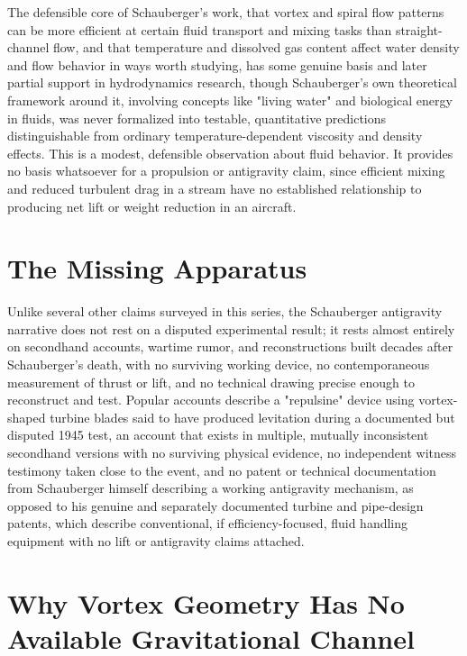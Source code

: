 \documentclass[11pt]{article}
\begin{document}
The defensible core of Schauberger's work, that vortex and spiral flow patterns can be more efficient at certain fluid transport and mixing tasks than straight-channel flow, and that temperature and dissolved gas content affect water density and flow behavior in ways worth studying, has some genuine basis and later partial support in hydrodynamics research, though Schauberger's own theoretical framework around it, involving concepts like "living water" and biological energy in fluids, was never formalized into testable, quantitative predictions distinguishable from ordinary temperature-dependent viscosity and density effects. This is a modest, defensible observation about fluid behavior. It provides no basis whatsoever for a propulsion or antigravity claim, since efficient mixing and reduced turbulent drag in a stream have no established relationship to producing net lift or weight reduction in an aircraft.

\section{The Missing Apparatus}

Unlike several other claims surveyed in this series, the Schauberger antigravity narrative does not rest on a disputed experimental result; it rests almost entirely on secondhand accounts, wartime rumor, and reconstructions built decades after Schauberger's death, with no surviving working device, no contemporaneous measurement of thrust or lift, and no technical drawing precise enough to reconstruct and test. Popular accounts describe a "repulsine" device using vortex-shaped turbine blades said to have produced levitation during a documented but disputed 1945 test, an account that exists in multiple, mutually inconsistent secondhand versions with no surviving physical evidence, no independent witness testimony taken close to the event, and no patent or technical documentation from Schauberger himself describing a working antigravity mechanism, as opposed to his genuine and separately documented turbine and pipe-design patents, which describe conventional, if efficiency-focused, fluid handling equipment with no lift or antigravity claims attached.

\section{Why Vortex Geometry Has No Available Gravitational Channel}
\end{document}
